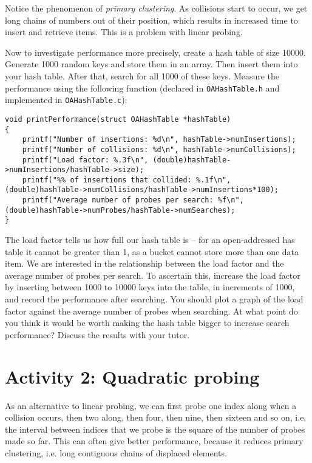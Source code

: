 \documentclass[10pt, a4paper, twosize]{article}
\begin{document}
Notice the phenomenon of \emph{primary clustering}. As collisions start to occur, we get long chains of numbers out of their position, which results in increased time to insert and retrieve items. This is a problem with linear probing.

Now to investigate performance more precisely, create a hash table of size 10000. Generate 1000 random keys and store them in an array. Then insert them into your hash table. After that, search for all 1000 of these keys. Measure the performance using the following function (declared in \texttt{OAHashTable.h} and implemented in \texttt{OAHashTable.c}):
\begin{lstlisting}
void printPerformance(struct OAHashTable *hashTable)
{
    printf("Number of insertions: %d\n", hashTable->numInsertions);
    printf("Number of collisions: %d\n", hashTable->numCollisions);
    printf("Load factor: %.3f\n", (double)hashTable->numInsertions/hashTable->size);
    printf("%% of insertions that collided: %.1f\n", (double)hashTable->numCollisions/hashTable->numInsertions*100);
    printf("Average number of probes per search: %f\n", (double)hashTable->numProbes/hashTable->numSearches);
}
\end{lstlisting}
The load factor tells us how full our hash table is -- for an open-addressed has table it cannot be greater than 1, as a bucket cannot store more than one data item. We are interested in the relationship between the load factor and the average number of probes per search. To ascertain this, increase the load factor by inserting between 1000 to 10000 keys into the table, in increments of 1000, and record the performance after searching. You should plot a graph of the load factor against the average number of probes when searching. At what point do you think it would be worth making the hash table bigger to increase search performance? Discuss the results with your tutor.

\section{Activity 2: Quadratic probing}
As an alternative to linear probing, we can first probe one index along when a collision occurs, then two along, then four, then nine, then sixteen and so on, i.e. the interval between indices that we probe is the square of the number of probes made so far. This can often give better performance, because it reduces primary clustering, i.e. long contiguous chains of displaced elements.
\end{document}
